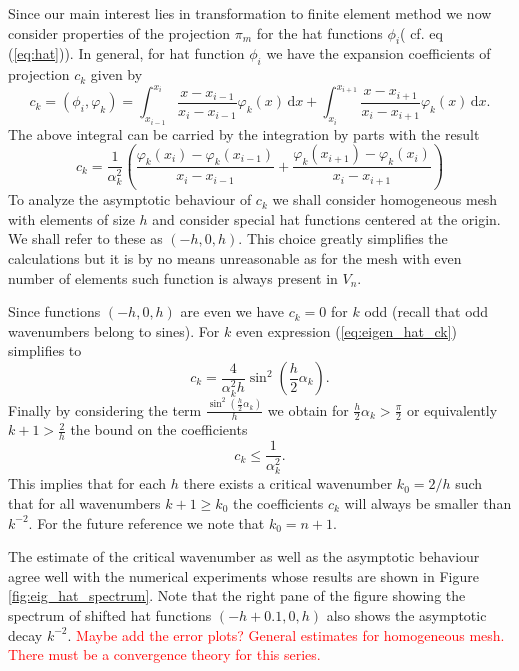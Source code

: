 \documentclass[a4paper,10pt]{article}
\newcommand{\inner}[2]{\ensuremath{\left(#1, #2\right)}}
\newcommand{\meas}[1]{\ensuremath{\,\mathrm{d}#1}}
\newcommand{\TODO}[1]{\textcolor{red}{#1}}
\begin{document}
  Since our main interest lies in transformation to finite element method we
  now consider properties of the projection $\pi_m$ for the hat functions
  $\phi_i$( cf. eq (\ref{eq:hat})). In general, for hat function $\phi_i$ we
  have the expansion coefficients of projection $c_k$ given by
  \[
    c_k = \inner{\phi_i}{\varphi_k} =
    \displaystyle\int_{x_{i-1}}^{x_{i}}\frac{x-x_{i-1}}{x_i-x_{i-1}}\varphi_k(x)\meas{x}+
    \displaystyle\int_{x_{i}}^{x_{i+1}}\frac{x-x_{i+1}}{x_i-x_{i+1}}\varphi_k(x)\meas{x}.
  \]
  The above integral can be carried by the integration by parts with the result
  \begin{equation}
    \label{eq:eigen_hat_ck}
    c_k =
    \frac{1}{\alpha_k^2}
    \left(
    \frac{\varphi_k(x_i) - \varphi_k(x_{i-1})}{x_i - x_{i-1}} +
    \frac{\varphi_k(x_{i+1}) - \varphi_k(x_{i})}{x_i - x_{i+1}}
    \right)
  \end{equation}
  To analyze the asymptotic behaviour of $c_k$ we shall consider homogeneous
  mesh with elements of size $h$ and consider special hat functions centered
  at the origin. We shall refer to these as $(-h, 0, h)$. This choice greatly
  simplifies the calculations but it is by no means unreasonable as for the mesh
  with even number of elements such function is always present in $V_n$.

  Since functions $(-h, 0, h)$ are even we have $c_k=0$ for $k$ odd (recall that
  odd wavenumbers belong to sines). For $k$ even expression
  (\ref{eq:eigen_hat_ck}) simplifies to
  \[
    c_k = \frac{4}{\alpha_k^2 h}\sin^2\left(\frac{h}{2}\alpha_k\right).
  \]
  Finally by considering the term
  $\frac{\sin^2\left(\frac{h}{2}\alpha_k\right)}{h}$
  we obtain for $\frac{h}{2}\alpha_k > \frac{\pi}{2}$ or equivalently 
  $k+1>\tfrac{2}{h}$ the bound on the coefficients
  \[
    c_k \leq \frac{1}{\alpha_k^2}.
  \]
  This implies that for each $h$ there exists a critical wavenumber $k_0=2/h$
  such that for all wavenumbers $k+1\geq k_0$ the coefficients $c_k$ will always
  be  smaller than $k^{-2}$. For the future reference we note that $k_0=n+1$.

  The estimate of the critical wavenumber as well as the asymptotic behaviour
  agree well with the numerical experiments whose results are shown in Figure
  \ref{fig:eig_hat_spectrum}. Note that the right pane of the figure showing
  the spectrum of shifted hat functions $(-h+0.1, 0, h)$ also shows the
  asymptotic decay $k^{-2}$.
  \TODO{Maybe add the error plots?}
  \TODO{General estimates for homogeneous mesh.}
  \TODO{There must be a convergence theory for this series.}
\end{document}
